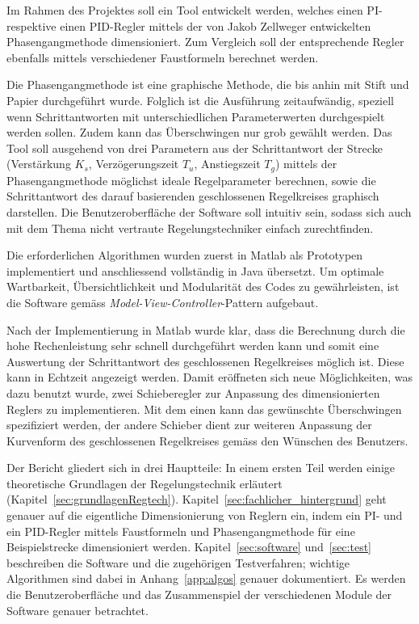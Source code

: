 Im Rahmen  des Projektes soll  ein Tool  entwickelt werden, welches  einen PI-
respektive  einen  PID-Regler mittels  der  von  Jakob Zellweger  entwickelten
Phasengangmethode dimensioniert. Zum  Vergleich soll der  entsprechende Regler
ebenfalls mittels verschiedener Faustformeln berechnet werden.

Die Phasengangmethode ist eine graphische Methode, die bis anhin mit Stift und
Papier  durchgef\"uhrt wurde. Folglich  ist die  Ausf\"uhrung zeitaufw\"andig,
speziell   wenn   Schrittantworten   mit   unterschiedlichen   Parameterwerten
durchgespielt werden sollen. Zudem kann das \"Uberschwingen nur grob gew\"ahlt
werden. Das Tool soll ausgehend von drei Parametern aus der Schrittantwort der
Strecke  (Verst\"arkung $K_s$,  Verz\"ogerungszeit $T_u$,  Anstiegszeit $T_g$)
mittels  der Phasengangmethode  m\"oglichst  ideale Regelparameter  berechnen,
sowie  die Schrittantwort  des darauf  basierenden geschlossenen  Regelkreises
graphisch  darstellen. Die  Benutzeroberfl\"ache  der Software  soll  intuitiv
sein,  sodass  sich auch  mit  dem  Thema nicht  vertraute  Regelungstechniker
einfach zurechtfinden.

Die    erforderlichen    Algorithmen    wurden   zuerst    in    Matlab    als
Prototypen   implementiert    und   anschliessend   vollst\"andig    in   Java
\"ubersetzt. Um  optimale Wartbarkeit,  \"Ubersichtlichkeit und  Modularit\"at
des    Codes     zu    gew\"ahrleisten,    ist    die     Software    gem\"ass
\emph{Model-View-Controller}-Pattern aufgebaut.

Nach  der Implementierung  in Matlab  wurde  klar, dass  die Berechnung  durch
die  hohe Rechenleistung  sehr schnell  durchgef\"uhrt werden  kann und  somit
eine Auswertung  der Schrittantwort  des geschlossenen  Regelkreises m\"oglich
ist.  Diese  kann in Echtzeit  angezeigt werden. Damit er\"offneten  sich neue
M\"oglichkeiten, was dazu benutzt wurde,  zwei Schieberegler zur Anpassung des
dimensionierten Reglers zu implementieren. Mit dem einen kann das gew\"unschte
\"Uberschwingen spezifiziert  werden, der  andere Schieber dient  zur weiteren
Anpassung  der   Kurvenform  des   geschlossenen  Regelkreises   gem\"ass  den
W\"unschen des Benutzers.

Der      Bericht      gliedert      sich      in      drei      Hauptteile: In
einem     ersten     Teil     werden    einige     theoretische     Grundlagen
der   Regelungstechnik    erl\"autert   (Kapitel~\ref{sec:grundlagenRegtech}).
Kapitel~\ref{sec:fachlicher_hintergrund}  geht  genauer  auf  die  eigentliche
Dimensionierung  von Reglern  ein, indem  ein PI-  und ein  PID-Regler mittels
Faustformeln  und Phasengangmethode  f\"ur eine  Beispielstrecke dimensioniert
werden.    Kapitel~\ref{sec:software}   und~\ref{sec:test}   beschreiben   die
Software  und  die  zugeh\"origen  Testverfahren;  wichtige  Algorithmen  sind
dabei   in   Anhang~\ref{app:algos}   genauer  dokumentiert. Es   werden   die
Benutzeroberfl\"ache  und  das  Zusammenspiel  der  verschiedenen  Module  der
Software genauer betrachtet.
